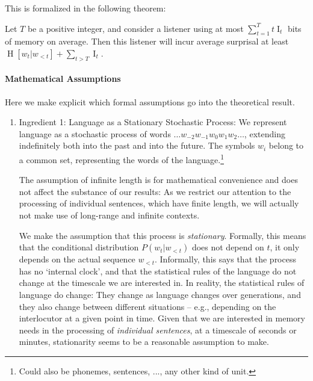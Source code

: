 This is formalized in the following theorem:

\begin{thm}\label{prop:suboptimal}
Let $T$ be a positive integer, and consider a listener using at most $\sum_{t=1}^T t \operatorname{I}_t$ bits of memory on average.
Then this listener will incur average surprisal at least
$\operatorname{H}[w_t|w_{<t}] + \sum_{t > T} \operatorname{I}_t$.
\end{thm}

\paragraph{Mathematical Assumptions}
Here we make explicit which formal assumptions go into the theoretical result.

\begin{enumerate}
\item Ingredient 1: Language as a Stationary Stochastic Process:
We represent language as a stochastic process of words $\dots w_{-2} w_{-1} w_0 w_{1} w_{2} \dots$, extending indefinitely both into the past and into the future.
The symbols $w_i$ belong to a common set, representing the words of the language.\footnote{Could also be phonemes, sentences, ..., any other kind of unit.}

The assumption of infinite length is for mathematical convenience and does not affect the substance of our results:
As we restrict our attention to the processing of individual sentences, which have finite length, we will actually not make use of long-range and infinite contexts.

We make the assumption that this process is \emph{stationary}.
Formally, this means that the conditional distribution $P(w_t|w_{<t})$ does not depend on $t$, it only depends on the actual sequence $w_{<t}$.
Informally, this says that the process has no `internal clock', and that the statistical rules of the language do not change at the timescale we are interested in.
In reality, the statistical rules of language do change: They change as language changes over generations, and they also change between different situations -- e.g., depending on the interlocutor at a given point in time.
Given that we are interested in memory needs in the processing of \emph{individual sentences}, at a timescale of seconds or minutes, stationarity seems to be a reasonable assumption to make.


\end{enumerate}
